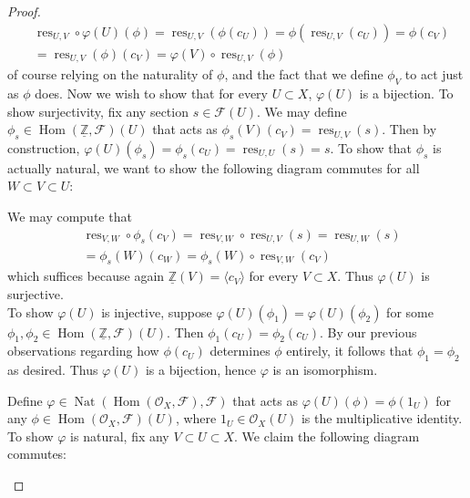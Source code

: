 \documentclass{article}
\newcommand{\Z}{\mathbb{Z}}
\newcommand{\fF}{\mathscr{F}}
\newcommand{\fO}{\mathscr{O}}
\DeclareMathOperator{\res}{\mathrm{res}}
\DeclareMathOperator{\Hom}{\mathrm{Hom}}
\DeclareMathOperator{\Nat}{\mathrm{Nat}}
\begin{document}
\begin{proof}
    \begin{align*}
        &\res_{U,V}\circ \varphi(U)(\phi)=\res_{U,V}(\phi(c_U))=\phi(\res_{U,V}(c_U))=\phi(c_V)\\
        &=\res_{U,V}(\phi)(c_V)=\varphi(V)\circ \res_{U,V}(\phi)
    \end{align*}
    of course relying on the naturality of $\phi$, and the fact that we define $\phi_{V}$ to act just as $\phi$ does. Now we wish to show that for every $U\subset X$, $\varphi(U)$ is a bijection. To show surjectivity, fix any section $s\in \fF(U)$. We may define $\phi_s\in \Hom(\underline{\Z},\fF)(U)$ that acts as $\phi_s(V)(c_V)=\res_{U,V}(s)$. Then by construction, $\varphi(U)(\phi_s)=\phi_s(c_U)=\res_{U,U}(s)=s$. To show that $\phi_s$ is actually natural, we want to show the following diagram commutes for all $W\subset V\subset U$:
    \begin{center}
    \end{center}
    We may compute that
    \begin{align*}
        &\res_{V,W}\circ \phi_s(c_V)=\res_{V,W}\circ \res_{U,V}(s)=\res_{U,W}(s)\\
        &=\phi_s(W)(c_W)=\phi_s(W)\circ \res_{V,W}(c_V)
    \end{align*}
    which suffices because again $\underline{\Z}(V)=\langle c_V\rangle$ for every $V\subset X$. Thus $\varphi(U)$ is surjective.\\
    To show $\varphi(U)$ is injective, suppose $\varphi(U)(\phi_1)=\varphi(U)(\phi_2)$ for some $\phi_1,\phi_2\in \Hom(\underline{\Z},\fF)(U)$. Then $\phi_1(c_U)=\phi_2(c_U)$. By our previous observations regarding how $\phi(c_U)$ determines $\phi$ entirely, it follows that $\phi_1=\phi_2$ as desired. Thus $\varphi(U)$ is a bijection, hence $\varphi$ is an isomorphism.
    \item Define $\varphi\in \Nat(\Hom(\fO_X,\fF),\fF)$ that acts as $\varphi(U)(\phi)=\phi(1_U)$ for any $\phi \in \Hom(\fO_X,\fF)(U)$, where $1_U\in \fO_X(U)$ is the multiplicative identity. To show $\varphi$ is natural, fix any $V\subset U\subset X$. We claim the following diagram commutes:
    \begin{center}
        \begin{tikzcd}

\end{tikzcd}
\end{center}
\end{proof}
\end{document}
